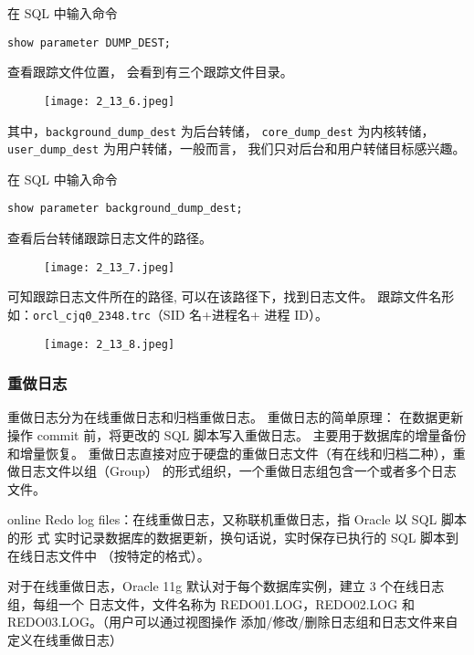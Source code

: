 在 SQL 中输入命令
\begin{verbatim}
show parameter DUMP_DEST;
\end{verbatim}
查看跟踪文件位置，
会看到有三个跟踪文件目录。
\begin{figure}[H]
  \begin{center}
    \texttt{[image: 2\_13\_6.jpeg]}
  \end{center}
\end{figure}

其中，\texttt{background\_dump\_dest} 为后台转储，
\texttt{core\_dump\_dest} 为内核转储，
\texttt{user\_dump\_dest} 为用户转储，一般而言，
我们只对后台和用户转储目标感兴趣。

在 SQL 中输入命令
\begin{verbatim}
show parameter background_dump_dest;
\end{verbatim}
查看后台转储跟踪日志文件的路径。
\begin{figure}[H]
  \begin{center}
    \texttt{[image: 2\_13\_7.jpeg]}
  \end{center}
\end{figure}

可知跟踪日志文件所在的路径,
可以在该路径下，找到日志文件。
跟踪文件名形如：\texttt{orcl\_cjq0\_2348.trc}（SID 名+进程名+ 进程 ID）。
\begin{figure}[H]
  \begin{center}
    \texttt{[image: 2\_13\_8.jpeg]}
  \end{center}
\end{figure}
%
\subsubsection{重做日志}
重做日志分为在线重做日志和归档重做日志。
重做日志的简单原理：
在数据更新操作 commit 前，将更改的 SQL 脚本写入重做日志。
主要用于数据库的增量备份和增量恢复。
重做日志直接对应于硬盘的重做日志文件（有在线和归档二种），重做日志文件以组（Group）
的形式组织，一个重做日志组包含一个或者多个日志文件。

online Redo log files：在线重做日志，又称联机重做日志，指 Oracle 以 SQL 脚本的形
式 实时记录数据库的数据更新，换句话说，实时保存已执行的 SQL 脚本到在线日志文件中
（按特定的格式）。

对于在线重做日志，Oracle 11g 默认对于每个数据库实例，建立 3 个在线日志组，每组一个
日志文件，文件名称为 REDO01.LOG，REDO02.LOG 和 REDO03.LOG。（用户可以通过视图操作
添加/修改/删除日志组和日志文件来自定义在线重做日志）

